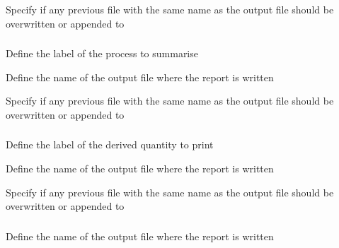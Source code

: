  {Specify if any previous file with the same name as the output file should be overwritten or appended to}

\subsubsection[Print a summary of a process]{}

 {Define the label of the process to summarise}

 {Define the name of the output file where the report is written}

 {Specify if any previous file with the same name as the output file should be overwritten or appended to}

\subsubsection[Print a derived quantity]{}

 {Define the label of the derived quantity to print}

 {Define the name of the output file where the report is written}

 {Specify if any previous file with the same name as the output file should be overwritten or appended to}

\subsubsection[Print a summary of the estimated parameters]{}

 {Define the name of the output file where the report is written}

